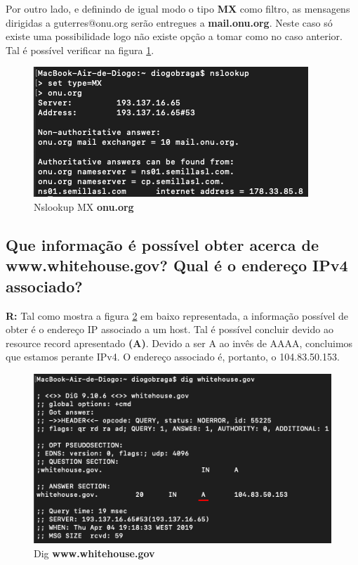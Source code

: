 \documentclass{llncs}
\begin{document}
Por outro lado, e definindo de igual modo o tipo \textbf{MX} como filtro, as mensagens dirigidas a guterres@onu.org serão entregues a \textbf{mail.onu.org}. Neste caso só existe uma possibilidade logo não existe opção a tomar como no caso anterior. Tal é possível verificar na figura \ref{fig:72}.

\begin{figure}[H]
\begin{center}
\includegraphics[scale=0.6]{7_2.png}
\end{center}
\caption{\label{fig:72}Nslookup MX \textbf{onu.org}}
\end{figure}


\subsection{\textbf{Que informação é possível obter acerca de www.whitehouse.gov? Qual é o endereço IPv4 associado?}}
\textbf{R:} Tal como mostra a figura \ref{fig:8} em baixo representada, a informação possível de obter é o endereço IP associado a um host. Tal é possível concluir devido ao resource record apresentado \textbf{(A)}. Devido a ser A ao invês de AAAA, concluimos que estamos perante IPv4. O endereço associado é, portanto, o 104.83.50.153.

\begin{figure}[H]
\begin{center}
\includegraphics[scale=0.6]{8.png}
\end{center}
\caption{\label{fig:8}Dig \textbf{www.whitehouse.gov}}
\end{figure}
\end{document}
